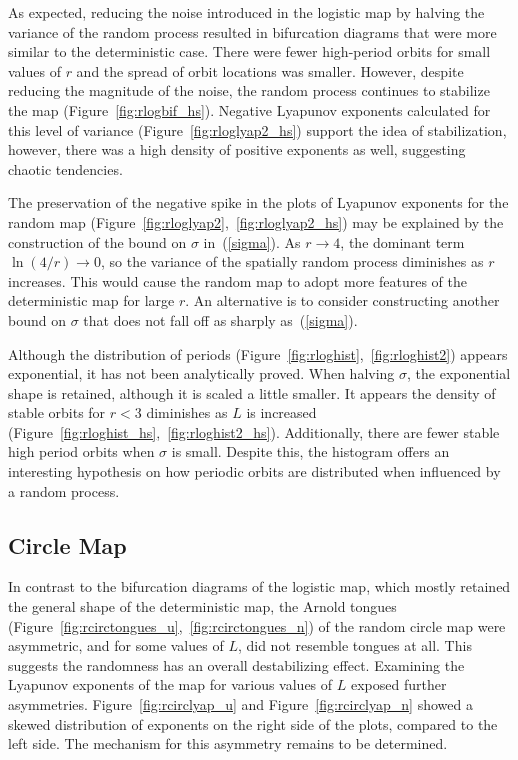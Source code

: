 As expected, reducing the noise introduced in the logistic
map by halving the variance of the random process resulted in
bifurcation diagrams that were more similar to the deterministic
case. There were fewer high-period orbits for small values of $r$ and the spread of orbit
locations was smaller. However, despite reducing
the magnitude of the noise, the random process continues to stabilize
the map (Figure~\ref{fig:rlogbif_hs}). Negative Lyapunov exponents calculated
for this level of variance (Figure~\ref{fig:rloglyap2_hs}) support the
idea of stabilization, however, there was a high density of positive
exponents as well, suggesting chaotic tendencies.

The preservation of the negative spike in the plots of Lyapunov
exponents for the random map
(Figure~\ref{fig:rloglyap2},~\ref{fig:rloglyap2_hs}) may be explained
by the construction of the bound on $\sigma$ in~(\ref{sigma}). As $r \to 4$, the
dominant term $\ln(4/r)
\to 0$, so the variance of the spatially random process diminishes as
$r$ increases. This would cause the random map to adopt more features
of the deterministic map for large $r$. An alternative is to consider constructing
another bound on $\sigma$ that does not fall off as sharply as~(\ref{sigma}).

Although the distribution of periods (Figure~\ref{fig:rloghist},~\ref{fig:rloghist2})
appears exponential, it has not been analytically proved. When halving
$\sigma$, the exponential shape is retained, although it is scaled a
little smaller. It appears the density of
stable orbits for $r<3$ diminishes as $L$ is increased (Figure~\ref{fig:rloghist_hs},~\ref{fig:rloghist2_hs}). Additionally,
there are fewer stable high period orbits when $\sigma$ is small. Despite this, the
histogram offers an interesting hypothesis on how periodic orbits are
distributed when influenced by a random process. 
\subsection{Circle Map}
In contrast to the bifurcation diagrams of the logistic map, which
mostly retained the general shape of the deterministic map, the
Arnold tongues (Figure~\ref{fig:rcirctongues_u},~\ref{fig:rcirctongues_n}) of the
random circle map were asymmetric, and for some values of $L$, did not
resemble tongues at all. This suggests the randomness has an overall
destabilizing effect. Examining the Lyapunov exponents of the map
for various values of $L$ exposed further asymmetries. Figure~\ref{fig:rcirclyap_u}
and Figure~\ref{fig:rcirclyap_n} showed a skewed distribution of
exponents on the right side of the plots, compared to the left
side. The mechanism for this asymmetry remains to be determined.

